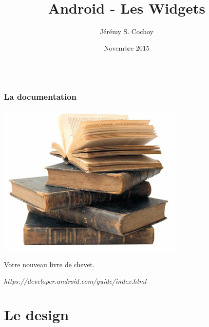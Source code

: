 \documentclass{beamer}
\begin{document}
\title{Android - Les Widgets}
\author{Jérémy S. Cochoy}
\date{Novembre 2015}


\begin{frame}
\titlepage
\end{frame}

\begin{frame}
  \begin{columns}[t]
  \begin{column}{5cm}
  \tableofcontents[sections={1-2}]
  \end{column}
  \begin{column}{5cm}
  \tableofcontents[sections={3-8}]
  \end{column}
  \end{columns}
\end{frame}

\begin{frame}
\frametitle{La documentation}
\begin{center}
\includegraphics[scale=0.5]{livres.png}
\end{center}
\begin{block}{Votre nouveau livre de chevet.}
\begin{center}
\emph{https://developer.android.com/guide/index.html}
\end{center}
\end{block}

\end{frame}

\section{Le design}
\end{document}
